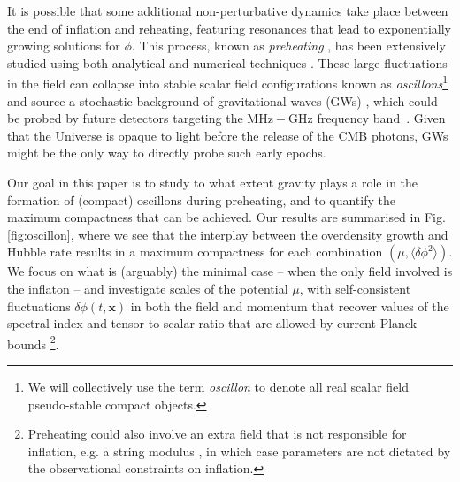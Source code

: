\documentclass[
    reprint,
    preprintnumbers,
    superscriptaddress,
    nofootinbib,
     amsmath,amssymb,
     aps,
     prd,
    floatfix,
    ]{revtex4-2}
\begin{document}
It is possible that some additional non-perturbative dynamics take place between the end of inflation and reheating, featuring resonances that lead to exponentially growing solutions for $\phi$. This process, known as \textit{preheating} \cite{Amin:2014eta}, has been extensively studied using both analytical and numerical techniques \cite{Amin:2010jq, Amin:2010dc, Amin:2011hj, Amin:2013ika, Felder:2006cc, Lozanov:2014zfa, Antusch:2015ziz, Antusch:2015vna, DeCross:2015uza,DeCross:2016fdz,DeCross:2016cbs,Kim:2017duj,Lozanov:2017hjm, Musoke:2019ima, Niemeyer:2019gab,Nguyen:2019kbm,Martin:2019nuw,Eggemeier:2020zeg,Iarygina:2020dwe,Sang:2020kpd,Martin:2020fgl,vandeVis:2020qcp,Kost:2021rbi,Garcia:2021iag,Eggemeier:2021smj,Kim:2021ipz,Figueroa:2022iho,Mahbub:2023faw}. These large fluctuations in the field can collapse into stable scalar field configurations known as \textit{oscillons}\footnote{We will collectively use the term \textit{oscillon} to denote all real scalar field pseudo-stable compact objects.} \cite{Bogolyubsky:1976nx,Bogolyubsky:1976sc,Gleiser:1993pt,Copeland:1995fq,Kasuya:2002zs,Saffin:2006yk,Hertzberg:2010yz,Salmi:2012ta,Gleiser:2019rvw,Antusch:2019qrr,Ibe:2019vyo,Zhang:2020bec,vanDissel:2023zva} and source a stochastic background of gravitational waves (GWs) \cite{Caprini:2018mtu,Dufaux:2007pt,Zhou:2013tsa,Antusch:2016con,Figueroa:2016ojl,Antusch:2017vga,Figueroa:2017vfa,Amin:2018xfe,Armendariz-Picon:2019csc,Armendariz-Picon:2020tkc,Hiramatsu:2020obh,Bhoonah:2020oov,Cai:2021gju,Adshead:2019lbr,Sang:2019ndv,Cui:2021are,Cosme:2022htl,Eggemeier:2022gyo,Krajewski:2022ezo,Lozanov:2022yoy}, which could be probed by future detectors targeting the $\mathrm{MHz-GHz}$ frequency band~\cite{Aggarwal:2020olq}. Given that the Universe is opaque to light before the release of the CMB photons, GWs might be the only way to directly probe such early epochs.


Our goal in this paper is to study to what extent gravity plays a role in the formation of (compact) oscillons during preheating, and to quantify the maximum compactness that can be achieved. Our results are summarised in Fig. \ref{fig:oscillon}, where we see that the interplay between the overdensity growth and Hubble rate results in a maximum compactness for each combination $(\mu,\langle \delta\phi^2 \rangle)$. We focus on what is (arguably) the minimal case -- when the only field involved is the inflaton -- and investigate scales of the potential $\mu$, with self-consistent fluctuations $\delta\phi(t,\mathbf{x})$ in both the field and momentum that recover values of the spectral index and tensor-to-scalar ratio that are allowed by current Planck bounds \cite{Planck:2018jri}\footnote{Preheating could also involve an extra field that is not responsible for inflation, e.g. a string modulus \cite{Antusch:2017vga}, in which case parameters are not dictated by the observational constraints on inflation.}.
\end{document}
